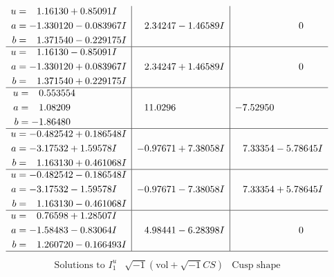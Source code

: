 \documentclass[1p]{elsarticle_modified}
\theoremstyle{definition}
\newcommand{\I}{\sqrt{-1}}
\begin{document}
$$\begin{array}{c|c|c}
\begin{aligned}
u &= \phantom{-}1.16130 + 0.85091 I \\
a &= -1.330120 - 0.083967 I \\
b &= \phantom{-}1.371540 - 0.229175 I\end{aligned}
 & \phantom{-}2.34247 - 1.46589 I & \phantom{-0.000000 } 0 \\ \hline\begin{aligned}
u &= \phantom{-}1.16130 - 0.85091 I \\
a &= -1.330120 + 0.083967 I \\
b &= \phantom{-}1.371540 + 0.229175 I\end{aligned}
 & \phantom{-}2.34247 + 1.46589 I & \phantom{-0.000000 } 0 \\ \hline\begin{aligned}
u &= \phantom{-}0.553554\phantom{ +0.000000I} \\
a &= \phantom{-}1.08209\phantom{ +0.000000I} \\
b &= -1.86480\phantom{ +0.000000I}\end{aligned}
 & \phantom{-}11.0296\phantom{ +0.000000I} & -7.52950\phantom{ +0.000000I} \\ \hline\begin{aligned}
u &= -0.482542 + 0.186548 I \\
a &= -3.17532 + 1.59578 I \\
b &= \phantom{-}1.163130 + 0.461068 I\end{aligned}
 & -0.97671 + 7.38058 I & \phantom{-}7.33354 - 5.78645 I \\ \hline\begin{aligned}
u &= -0.482542 - 0.186548 I \\
a &= -3.17532 - 1.59578 I \\
b &= \phantom{-}1.163130 - 0.461068 I\end{aligned}
 & -0.97671 - 7.38058 I & \phantom{-}7.33354 + 5.78645 I \\ \hline\begin{aligned}
u &= \phantom{-}0.76598 + 1.28507 I \\
a &= -1.58483 - 0.83064 I \\
b &= \phantom{-}1.260720 - 0.166493 I\end{aligned}
 & \phantom{-}4.98441 - 6.28398 I & \phantom{-0.000000 } 0\\
 \hline 
 \end{array}$$\newpage$$\begin{array}{c|c|c}  
\text{Solutions to }I^u_{1}& \I (\text{vol} + \sqrt{-1}CS) & \text{Cusp shape}\\

\end{array}$$
\end{document}
